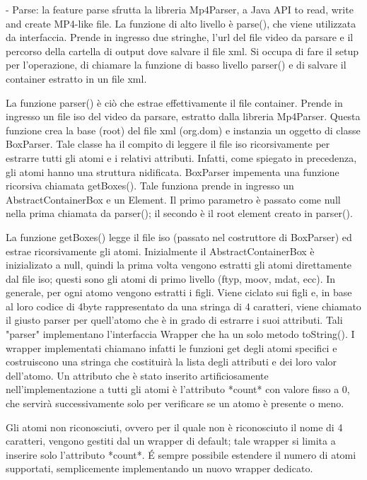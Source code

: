 - Parse:
 la feature parse sfrutta la libreria Mp4Parser, a Java API to read, write and create MP4-like file.
 La funzione di alto livello è parse(), che viene utilizzata da interfaccia. Prende in ingresso due stringhe, l'url del file video da parsare e il percorso della cartella di output dove salvare il file xml. Si occupa di fare il setup per l'operazione, di chiamare la funzione di basso livello parser() e di salvare il container estratto in un file xml.

 La funzione parser() è ciò che estrae effettivamente il file container. Prende in ingresso un file iso del video da parsare, estratto dalla libreria Mp4Parser. Questa funzione crea la base (root) del file xml (org.dom) e instanzia un oggetto di classe BoxParser. Tale classe ha il compito di leggere il file iso ricorsivamente per estrarre tutti gli atomi e i relativi attributi. Infatti, come spiegato in precedenza, gli atomi hanno una struttura nidificata. BoxParser impementa una funzione ricorsiva chiamata getBoxes(). Tale funziona prende in ingresso un AbstractContainerBox e un Element. Il primo parametro è passato come null nella prima chiamata da parser(); il secondo è il root element creato in parser().

 La funzione getBoxes() legge il file iso (passato nel costruttore di BoxParser) ed estrae ricorsivamente gli atomi. Inizialmente il AbstractContainerBox è inizializato a null, quindi la prima volta vengono estratti gli atomi direttamente dal file iso; questi sono gli atomi di primo livello (ftyp, moov, mdat, ecc). In generale, per ogni atomo vengono estratti i figli. Viene ciclato sui figli e, in base al loro codice di 4byte rappresentato da una stringa di 4 caratteri, viene chiamato il giusto parser per quell'atomo che è in grado di estrarre i suoi attributi. Tali "parser" implementano l'interfaccia Wrapper che ha un solo metodo toString(). I wrapper implementati chiamano infatti le funzioni get degli atomi specifici e costruiscono una stringa che costituirà la lista degli attributi e dei loro valor dell'atomo. Un attributo che è stato inserito artificiosamente nell'implementazione a tutti gli atomi è l'attributo *count* con valore fisso a 0, che servirà successivamente solo per verificare se un atomo è presente o meno.

 Gli atomi non riconosciuti, ovvero per il quale non è riconosciuto il nome di 4 caratteri, vengono gestiti dal un wrapper di default; tale wrapper si limita a inserire solo l'attributo *count*. É sempre possibile estendere il numero di atomi supportati, semplicemente implementando un nuovo wrapper dedicato.

